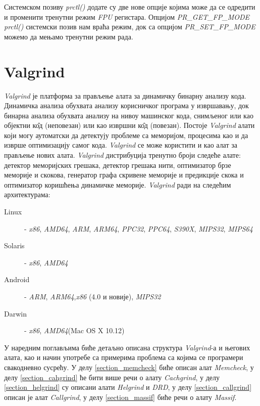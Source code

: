 \documentclass[12pt,oneside]{memoir}
\begin{document}
\indent Системском позиву \textit{prctl()} додате су две нове опције којима може да се одредити и променити тренутни режим \textit{FPU} регистара. Опцијом \textit{PR\_GET\_FP\_MODE} \textit{prctl()} системски позив нам враћа режим, док са опцијом \textit{PR\_SET\_FP\_MODE} можемо да мењамо тренутни режим рада.

\chapter{Valgrind}
\label{chp:valgrind}

\indent \textit{Valgrind} је платформа за прављење алата за динамичку бинарну анализу кода. Динамичка анализа обухвата анализу корисничког програма у извршавању, док бинарна анализа обухвата анализу на нивоу машинског кода, снимљеног или као објектни к\^{о}д (неповезан) или као извршни к\^{о}д (повезан). Постоје \textit{Valgrind} алати који могу аутоматски да детектују проблеме са меморијом, процесима као и да изврше оптимизацију самог кода. \textit{Valgrind} се може користити и као алат за прављење нових алата. \textit{Valgrind} дистрибуција тренутно броји следеће алате: детектор меморијских грешака, детектор грешака нити, оптимизатор брзе меморије и скокова, генератор графа скривене меморије и предикције скока и оптимизатор коришћења динамичке меморије. \textit{Valgrind} ради на следећим архитектурама: 
\begin{description}
	\item[Linux] - \textit{x86}, \textit{AMD64}, \textit{ARM}, \textit{ARM64}, \textit{PPC32}, \textit{PPC64}, \textit{S390X}, \textit{MIPS32}, \textit{MIPS64}
	\item[Solaris] - \textit{x86}, \textit{AMD64}
	\item[Android] - \textit{ARM}, \textit{ARM64},\textit{x86} (4.0 и новије), \textit{MIPS32}
	\item[Darwin] - \textit{x86}, \textit{AMD64}(Mac OS X 10.12)
\end{description}

\indent У наредним поглављима биће детаљно описана структура \textit{Valgrind}-а и његових алата, као и начин употребе са примерима проблема са којима се програмери свакодневно сусрећу. У делу \ref{section_memcheck} биће описан алат \textit{Memcheck}, у делу \ref{section_cahgrind} ће бити више речи о алату \textit{Cachgrind}, у делу \ref{section_helgrind} су описани алати \textit{Helgrind} и \textit{DRD}, у делу \ref{section_callgrind} описан је алат \textit{Callgrind}, у делу \ref{section_massif} биће речи о алату \textit{Massif}.
\end{document}
